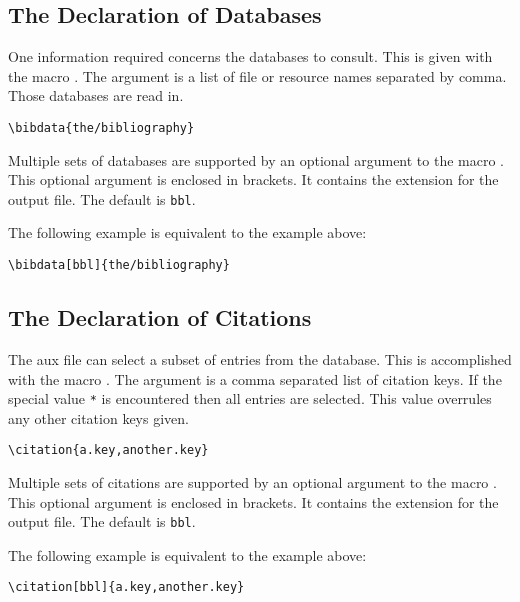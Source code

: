 \subsection{The Declaration of Databases}

One information required concerns the databases to consult. This is
given with the macro . The argument is a list of file
or resource names separated by comma. Those databases are read in.

\begin{lstlisting}[language={[LaTeX]TeX}]
  \bibdata{the/bibliography}
\end{lstlisting}

Multiple sets of databases are supported by an optional argument to
the macro . This optional argument is enclosed in
brackets. It contains the extension for the output file. The default
is \texttt{bbl}.

The following example is equivalent to the example above:

\begin{lstlisting}[language={[LaTeX]TeX}]
  \bibdata[bbl]{the/bibliography}
\end{lstlisting}


\subsection{The Declaration of Citations}

The aux file can select a subset of entries from the database. This is
accomplished with the macro . The argument is a comma
separated list of citation keys. If the special value \verb|*| is
encountered then all entries are selected. This value overrules any
other citation keys given.

\begin{lstlisting}[language={[LaTeX]TeX}]
  \citation{a.key,another.key}
\end{lstlisting}

Multiple sets of citations are supported by an optional argument to
the macro . This optional argument is enclosed in
brackets. It contains the extension for the output file. The default
is \texttt{bbl}.

The following example is equivalent to the example above:

\begin{lstlisting}[language={[LaTeX]TeX}]
  \citation[bbl]{a.key,another.key}
\end{lstlisting}


